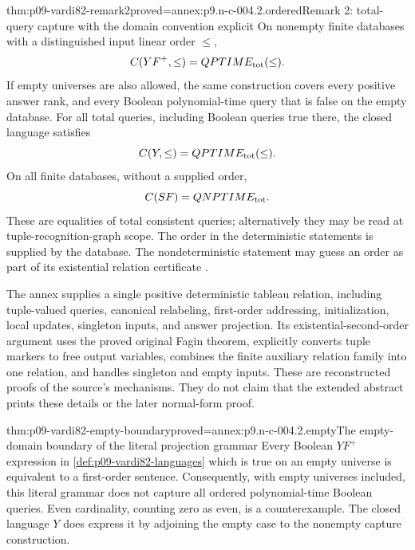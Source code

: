 \begin{hbtheorem}{thm:p09-vardi82-remark2}{proved=annex:p9.n-c-004.2.ordered}{Remark 2: total-query capture with the domain convention explicit}
On nonempty finite databases with a distinguished input linear order
\(\leq\),
\[
 C(YF^+,\leq)=QPTIME_{\rm tot}(\leq).
\]
If empty universes are also allowed, the same construction covers every
positive answer rank, and every Boolean polynomial-time query that is
false on the empty database. For all total queries, including Boolean
queries true there, the closed language satisfies
\[
 C(Y,\leq)=QPTIME_{\rm tot}(\leq).
\]
On all finite databases, without a supplied order,
\[
 C(SF)=QNPTIME_{\rm tot}.
\]
These are equalities of total consistent
queries; alternatively they may be read at tuple-recognition-graph scope.
The order in the deterministic statements is supplied by the database.
The nondeterministic statement may guess an order as part of its
existential relation certificate
\cite[Remark~2, pp.~142--143]{Vardi1982}.
\end{hbtheorem}

The annex supplies a single positive deterministic tableau relation, including
tuple-valued queries, canonical relabeling, first-order addressing,
initialization, local updates, singleton inputs, and answer projection.
Its existential-second-order argument uses the proved original Fagin
theorem, explicitly converts tuple markers to free output variables,
combines the finite auxiliary relation family into one relation, and handles
singleton and empty inputs. These are reconstructed proofs of the source's
mechanisms. They do not claim that the extended abstract prints these
details or the later normal-form proof.

\begin{hblemma}{thm:p09-vardi82-empty-boundary}{proved=annex:p9.n-c-004.2.empty}{The empty-domain boundary of the literal projection grammar}
Every Boolean \(YF^+\) expression in
\cref{def:p09-vardi82-languages} which is true on an empty universe is
equivalent to a first-order sentence. Consequently, with empty universes
included, this literal grammar does not capture all ordered polynomial-time
Boolean queries. Even cardinality, counting zero as even, is a counterexample.
The closed language \(Y\) does express it by adjoining the empty case to
the nonempty capture construction.
\end{hblemma}


